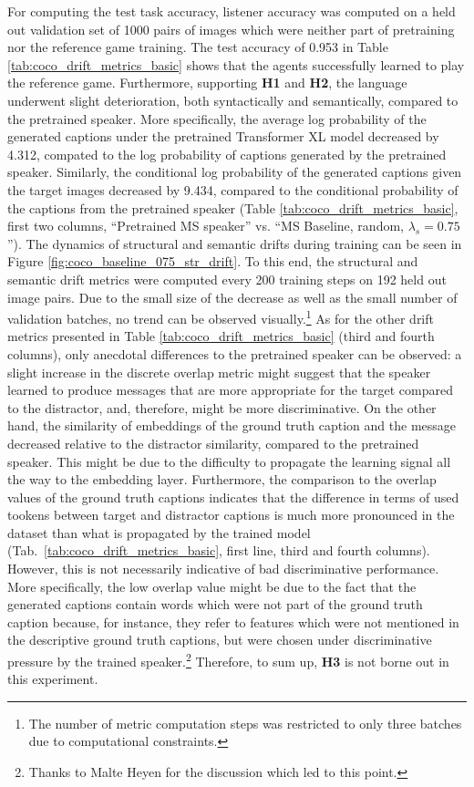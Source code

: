 For computing the test task accuracy, listener accuracy was computed on a held out validation set of 1000 pairs of images which were neither part of pretraining nor the reference game training. The test accuracy of 0.953 in Table \ref{tab:coco_drift_metrics_basic} shows that the agents successfully learned to play the reference game. Furthermore, supporting \textbf{H1} and \textbf{H2}, the language underwent slight deterioration, both syntactically and semantically, compared to the pretrained speaker. More specifically, the average log probability of the generated captions under the pretrained Transformer XL model decreased by 4.312, compated to the log probability of captions generated by the pretrained speaker. Similarly, the conditional log probability of the generated captions given the target images decreased by 9.434, compared to the conditional probability of the captions from the pretrained speaker (Table \ref{tab:coco_drift_metrics_basic}, first two columns, ``Pretrained MS speaker'' vs. ``MS Baseline, random, $\lambda_s=0.75$''). The dynamics of structural and semantic drifts during training can be seen in Figure \ref{fig:coco_baseline_075_str_drift}. To this end, the structural and semantic drift metrics were computed every 200 training steps on 192 held out image pairs. Due to the small size of the decrease as well as the small number of validation batches, no trend can be observed visually.\footnote{The number of metric computation steps was restricted to only three batches due to computational constraints.} 
As for the other drift metrics presented in Table \ref{tab:coco_drift_metrics_basic} (third and fourth columns), only anecdotal differences to the pretrained speaker can be observed: a slight increase in the discrete overlap metric might suggest that the speaker learned to produce messages that are more appropriate for the target compared to the distractor, and, therefore, might be more discriminative. On the other hand, the similarity of embeddings of the ground truth caption and the message decreased relative to the distractor similarity, compared to the pretrained speaker. This might be due to the difficulty to propagate the learning signal all the way to the embedding layer. Furthermore, the comparison to the overlap values of the ground truth captions indicates that the difference in terms of used tookens between target and distractor captions is much more pronounced in the dataset than what is propagated by the trained model (Tab.~\ref{tab:coco_drift_metrics_basic}, first line, third and fourth columns).  However, this is not necessarily indicative of bad discriminative performance. More specifically, the low overlap value might be due to the fact that the generated captions contain words which were not part of the ground truth caption because, for instance, they refer to features which were not mentioned in the descriptive ground truth captions, but were chosen under discriminative pressure by the trained speaker.\footnote{Thanks to Malte Heyen for the discussion which led to this point.} 
Therefore, to sum up, \textbf{H3} is not borne out in this experiment.

